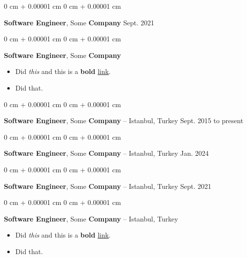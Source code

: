 \documentclass[10pt, letterpaper]{article}
\newenvironment{highlights}{
    \begin{itemize}[
        topsep=0.10 cm,
        parsep=0.10 cm,
        partopsep=0pt,
        itemsep=0pt,
        leftmargin=0 cm + 10pt
    ]
}{
    \end{itemize}
        
    \vspace{-0.20cm}
} %
\newenvironment{onecolentry}{
    \begin{adjustwidth}{
        0 cm + 0.00001 cm
    }{
        0 cm + 0.00001 cm
    }
}{
    \end{adjustwidth}
} %
\begin{document}
        \vspace{0.1 cm}

        \begin{onecolentry}
            \textbf{Software Engineer}, Some \textbf{Company} \hfill Sept. 2021
        \end{onecolentry}

        \vspace{0.1 cm}

        \begin{onecolentry}
            \textbf{Software Engineer}, Some \textbf{Company} \hfill 
            \begin{highlights}
                \item Did \textit{this} and this is a \textbf{bold} \href{https://example.com}{link}.
                \item Did that.
            \end{highlights}
        \end{onecolentry}

        \vspace{0.1 cm}

        \begin{onecolentry}
            \textbf{Software Engineer}, Some \textbf{Company} -- Istanbul, Turkey \hfill Sept. 2015 to present
        \end{onecolentry}

        \vspace{0.1 cm}

        \begin{onecolentry}
            \textbf{Software Engineer}, Some \textbf{Company} -- Istanbul, Turkey \hfill Jan. 2024
        \end{onecolentry}

        \vspace{0.1 cm}

        \begin{onecolentry}
            \textbf{Software Engineer}, Some \textbf{Company} -- Istanbul, Turkey \hfill Sept. 2021
        \end{onecolentry}

        \vspace{0.1 cm}

        \begin{onecolentry}
            \textbf{Software Engineer}, Some \textbf{Company} -- Istanbul, Turkey \hfill 
            \begin{highlights}
                \item Did \textit{this} and this is a \textbf{bold} \href{https://example.com}{link}.
                \item Did that.
            \end{highlights}
        \end{onecolentry}
\end{document}
